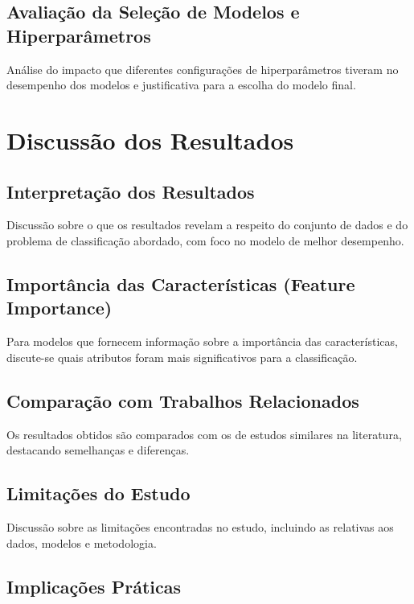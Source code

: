 \subsection{Avaliação da Seleção de Modelos e Hiperparâmetros}

Análise do impacto que diferentes configurações de hiperparâmetros tiveram no desempenho dos modelos e justificativa para a escolha do modelo final.

\section{Discussão dos Resultados}

\subsection{Interpretação dos Resultados}

Discussão sobre o que os resultados revelam a respeito do conjunto de dados e do problema de classificação abordado, com foco no modelo de melhor desempenho.

\subsection{Importância das Características (Feature Importance)}

Para modelos que fornecem informação sobre a importância das características, discute-se quais atributos foram mais significativos para a classificação.

\subsection{Comparação com Trabalhos Relacionados}

Os resultados obtidos são comparados com os de estudos similares na literatura, destacando semelhanças e diferenças.

\subsection{Limitações do Estudo}

Discussão sobre as limitações encontradas no estudo, incluindo as relativas aos dados, modelos e metodologia.

\subsection{Implicações Práticas}

